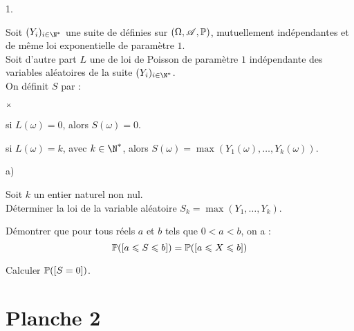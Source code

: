 \documentclass[11pt]{article}%
\begin{document}
\begin{noliste}{1.}
 \item Soit $(Y_i)_{i\in\N^*}$ une suite de \var définies sur $(\Omega, 
 \mathscr{A}, \mathbb{P})$, mutuellement indépendantes et de même loi exponentielle 
 de paramètre $1$.\\
 Soit d'autre part $L$ une \var de loi de Poisson de paramètre $1$ 
 indépendante des variables aléatoires de la suite $(Y_i)_{i\in\N^*}$.\\
 On définit $S$ par :
 \begin{noliste}{$\scriptstyle \times$}
  \item si $L(\omega)=0$, alors $S(\omega)=0$.
  \item si $L(\omega)=k$, avec $k\in\N^*$, alors $S(\omega) = 
  \max(Y_1(\omega), \hdots, Y_k(\omega))$.
 \end{noliste}
 \begin{noliste}{a)}
  \item Soit $k$ un entier naturel non nul.\\
  Déterminer la loi de la variable aléatoire $S_k=\max(Y_1,\hdots, 
  Y_k)$.
  \item Démontrer que pour tous réels $a$ et $b$ tels que $0<a<b$, 
  on a :
  \[
   \mathbb{P}(\left[ {a\leqslant S \leqslant b} \right]) = \mathbb{P}(\left[ {a\leqslant X \leqslant b} \right])
  \]
  \item Calculer $\mathbb{P}(\left[ {S=0} \right])$.
 \end{noliste}
\end{noliste}



\newpage


\section*{Planche 2} %
\end{document}
